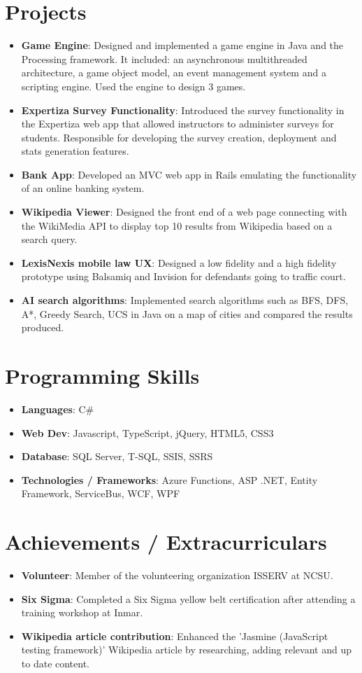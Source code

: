 \documentclass[letterpaper,11pt]{article}
\newcommand{\resumeItem}[2]{
  \item\small{
    \textbf{#1}{: #2 \vspace{-2pt}}
  }
}
\newcommand{\resumeSubItem}[2]{\resumeItem{#1}{#2}\vspace{-4pt}}
\newcommand{\resumeSubHeadingListStart}{\begin{itemize}[leftmargin=*]}
\newcommand{\resumeSubHeadingListEnd}{\end{itemize}}
\begin{document}

\section{Projects}
  \resumeSubHeadingListStart
    \resumeSubItem{Game Engine}
      {Designed and implemented a game engine in Java and the Processing framework. It included: an asynchronous multithreaded architecture, a game object model, an event management system and a scripting engine. Used the engine to design 3 games.}
    \resumeSubItem{Expertiza Survey Functionality}
      {Introduced the survey functionality in the Expertiza web app that allowed instructors to administer surveys for students. Responsible for developing the survey creation, deployment and stats generation features.}
    \resumeSubItem{Bank App}
      {Developed an MVC web app in Rails emulating the functionality of an online banking system.}
    \resumeSubItem{Wikipedia Viewer}
      {Designed the front end of a web page connecting with the WikiMedia API to display top 10 results from Wikipedia based on a search query.}
    \resumeSubItem{LexisNexis mobile law UX}
      {Designed a low fidelity and a high fidelity prototype using Balsamiq and Invision for defendants going to traffic court.}
      \resumeSubItem{AI search algorithms}
      {Implemented search algorithms such as BFS, DFS, A*, Greedy Search, UCS in Java on a map of cities and compared the results produced.}
  \resumeSubHeadingListEnd


\section{Programming Skills}
  \resumeSubHeadingListStart
    \resumeSubItem{Languages}{C\#}
    \resumeSubItem{Web Dev}{Javascript, TypeScript, jQuery, HTML5, CSS3}
    \resumeSubItem{Database}{SQL Server, T-SQL, SSIS, SSRS}    
    \resumeSubItem{Technologies / Frameworks}{Azure Functions, ASP .NET, Entity Framework, ServiceBus, WCF, WPF}
  \resumeSubHeadingListEnd


\section{Achievements / Extracurriculars}
  \resumeSubHeadingListStart
    \resumeSubItem{Volunteer}
      {Member of the volunteering organization ISSERV at NCSU.}
    \resumeSubItem{Six Sigma}
      {Completed a Six Sigma yellow belt certification after attending a training workshop at Inmar.}
    \resumeSubItem{Wikipedia article contribution}
      {Enhanced the 'Jasmine (JavaScript testing framework)' Wikipedia article by researching, adding relevant and up to date content.}
  \resumeSubHeadingListEnd

\end{document}
